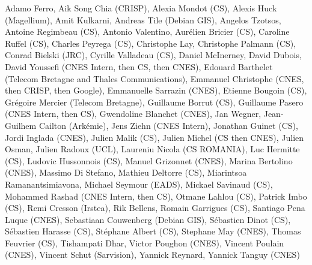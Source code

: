 Adamo Ferro,
Aik Song Chia (CRISP),
Alexia Mondot (CS),
Alexis Huck (Magellium),
Amit Kulkarni,
Andreas Tile (Debian GIS),
Angelos Tzotsos,
Antoine Regimbeau (CS),
Antonio Valentino,
Aur\'elien Bricier (CS),
Caroline Ruffel (CS),
Charles Peyrega (CS),
Christophe Lay,
Christophe Palmann (CS),
Conrad Bielski (JRC),
Cyrille Valladeau (CS),
Daniel McInerney,
David Dubois,
David Youssefi  (CNES Intern, then CS, then CNES),
Edouard Barthelet (Telecom Bretagne and Thales Communications),
Emmanuel Christophe (CNES, then CRISP, then Google),
Emmanuelle Sarrazin (CNES),
Etienne Bougoin (CS),
Gr\'egoire Mercier (Telecom Bretagne),
Guillaume Borrut (CS),
Guillaume Pasero (CNES Intern, then CS),
Gwendoline Blanchet (CNES),
Jan Wegner,
Jean-Guilhem Cailton (Ark\'emie),
Jens Ziehn (CNES Intern),
Jonathan Guinet (CS),
Jordi Inglada (CNES),
Julien Malik (CS),
Julien Michel (CS then CNES),
Julien Osman,
Julien Radoux (UCL),
Laureniu Nicola (CS ROMANIA),
Luc Hermitte (CS),
Ludovic Hussonnois (CS),
Manuel Grizonnet (CNES),
Marina Bertolino (CNES),
Massimo Di Stefano,
Mathieu Deltorre (CS),
Miarintsoa Ramanantsimiavona,
Michael Seymour (EADS),
Mickael Savinaud (CS),
Mohammed Rashad (CNES Intern, then CS),
Otmane Lahlou (CS),
Patrick Imbo (CS),
Remi Cresson (Irstea),
Rik Bellens,
Romain Garrigues (CS),
Santiago Pena Luque (CNES),
Sebastiaan Couwenberg (Debian GIS),
S\'ebastien Dinot (CS),
S\'ebastien Harasse (CS),
St\'ephane Albert (CS),
Stephane May (CNES),
Thomas Feuvrier (CS),
Tishampati Dhar,
Victor Poughon (CNES),
Vincent Poulain (CNES),
Vincent Schut (Sarvision),
Yannick Reynard,
Yannick Tanguy (CNES)
